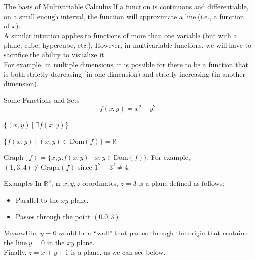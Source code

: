 \documentclass[8pt]{extarticle}
\title{}
\author{Avinash Iyer}
\date{}
\begin{document}
\renewcommand{\arraystretch}{1.5}
  \begin{problem}{The basis of Multivariable Calculus}
    If a function is continuous and differentiable, on a small enough interval, the function will approximate a line (i.e., a function of $x$).\\

    A similar intuition applies to functions of more than one variable (but with a plane, cube, hypercube, etc.). However, in multivariable functions, we will have to sacrifice the ability to visualize it.\\

    For example, in multiple dimensions, it is possible for there to be a function that is both strictly decreasing (in one dimension) and strictly increasing (in another dimension).
  \end{problem}
  \begin{problem}{Some Functions and Sets}
    \[
      f(x,y) = x^2-y^2
    \] 
    \begin{description}[font=\normalfont\scshape]
      \item[Domain:]  $\{(x,y)\mid \exists f(x,y)\}$
      \item[Range:] $\{f(x,y) \mid (x,y)\in \textrm{Dom}(f)\} = \mathbb{R}$
      \item[Graph:] $\textrm{Graph}(f) = \{x,y.f(x,y) \mid x,y\in \textrm{Dom}(f)\}$. For example, $(1,3,4)\notin \textrm{Graph}(f)$ since $1^2-3^2 \neq 4$.
    \end{description}
  \end{problem}
  \begin{problem}{Examples}
    In $\mathbb{R}^3$, in $x,y,z$ coordinates, $z=3$ is a plane defined as follows:
    \begin{itemize}
      \item Parallel to the $xy$ plane.
      \item Passes through the point $(0.0,3)$.
    \end{itemize}
    \begin{center}
    \end{center}
    Meanwhile, $y=0$ would be a ``wall'' that passes through the origin that contains the line $y=0$ in the $xy$ plane.\\

    Finally, $z = x+y+1$ is a plane, as we can see below.
    \begin{center}
    \end{center}
  \end{problem}
\end{document}
